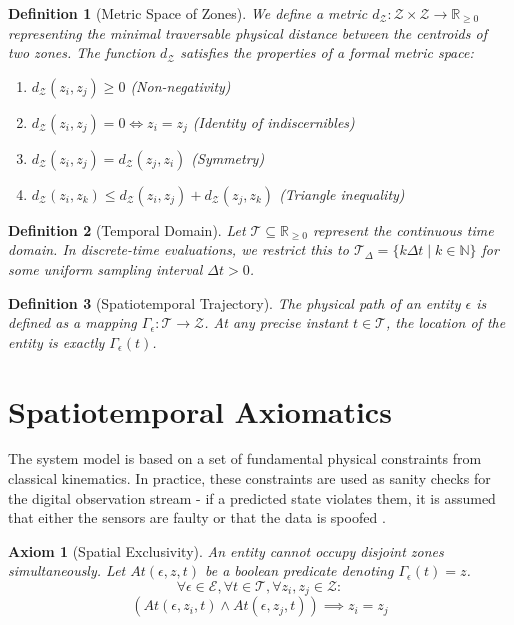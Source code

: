 \documentclass[conference]{IEEEtran}
\newtheorem{definition}{Definition}
\newtheorem{axiom}{Axiom}
\newcommand{\E}{\mathcal{E}} %
\newcommand{\Z}{\mathcal{Z}} %
\newcommand{\T}{\mathcal{T}} %
\newcommand{\Tr}{\Gamma} %
\begin{document}
\begin{definition}[Metric Space of Zones]
We define a metric $d_\Z: \Z \times \Z \to \mathbb{R}_{\ge 0}$ representing the minimal traversable physical distance between the centroids of two zones. The function $d_\Z$ satisfies the properties of a formal metric space:
\begin{enumerate}
    \item $d_\Z(z_i, z_j) \ge 0$ (Non-negativity)
    \item $d_\Z(z_i, z_j) = 0 \iff z_i = z_j$ (Identity of indiscernibles)
    \item $d_\Z(z_i, z_j) = d_\Z(z_j, z_i)$ (Symmetry)
    \item $d_\Z(z_i, z_k) \le d_\Z(z_i, z_j) + d_\Z(z_j, z_k)$ (Triangle inequality)
\end{enumerate}
\end{definition}

\begin{definition}[Temporal Domain]
Let $\T \subseteq \mathbb{R}_{\ge 0}$ represent the continuous time domain. In discrete-time evaluations, we restrict this to $\T_{\Delta} = \{ k\Delta t \mid k \in \mathbb{N} \}$ for some uniform sampling interval $\Delta t > 0$.
\end{definition}

\begin{definition}[Spatiotemporal Trajectory]
The physical path of an entity $\epsilon$ is defined as a mapping $\Tr_\epsilon: \T \to \Z$. At any precise instant $t \in \T$, the location of the entity is exactly $\Tr_\epsilon(t)$.
\end{definition}

\section{Spatiotemporal Axiomatics}

The system model is based on a set of fundamental physical constraints from classical kinematics. In practice, these constraints are used as sanity checks for the digital observation stream - if a predicted state violates them, it is assumed that either the sensors are faulty or that the data is spoofed \cite{b18}.



\begin{axiom}[Spatial Exclusivity]
An entity cannot occupy disjoint zones simultaneously. Let $At(\epsilon, z, t)$ be a boolean predicate denoting $\Tr_\epsilon(t) = z$.
\begin{equation}
\forall \epsilon \in \E, \forall t \in \T, \forall z_i, z_j \in \Z: 
\end{equation}
\begin{equation*}
(At(\epsilon, z_i, t) \land At(\epsilon, z_j, t)) \implies z_i = z_j
\end{equation*}
\end{axiom}
\end{document}
